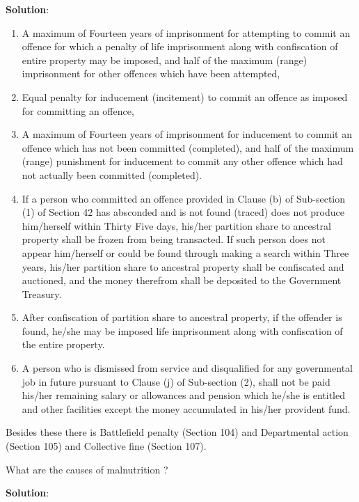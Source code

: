 \documentclass[
]{book}
\newcommand{\question}{\item}
\newenvironment{solution}{ {\bfseries Solution}:}{}
\begin{document}
\begin{questions}
\begin{solution}
\begin{enumerate}
  \begin{enumerate}
    \item A maximum of Fourteen years of imprisonment for attempting to commit an offence for which a penalty of life imprisonment along with confiscation of entire property may be imposed, and half of the maximum (range) imprisonment for other offences which have been attempted,
    \item Equal penalty for inducement (incitement) to commit an offence as imposed for committing an offence,
    \item A maximum of Fourteen years of imprisonment for inducement to commit an offence which has not been committed (completed), and half of the maximum (range) punishment for inducement to commit any other offence which had not actually been committed (completed).
    \item If a person who committed an offence provided in Clause (b) of Sub-section (1) of Section 42 has absconded and is not found (traced) does not produce him/herself within Thirty Five days, his/her partition share to ancestral property shall be frozen from being transacted. If such person does not appear him/herself or could be found through making a search within Three years, his/her partition share to ancestral property shall be confiscated and auctioned, and the money therefrom shall be deposited to the Government Treasury.
    \item After confiscation of partition share to ancestral property, if the  offender is found, he/she may be imposed life imprisonment along with confiscation of the entire property.
    \item A person who is dismissed from service and disqualified for any governmental job in future pursuant to Clause (j) of Sub-section (2), shall not be paid his/her remaining salary or allowances and pension which he/she is entitled and other facilities except the money accumulated in his/her provident fund.
  \end{enumerate}
\end{enumerate}

Besides these there is Battlefield penalty (Section 104) and Departmental action (Section 105) and Collective fine (Section 107).

\end{solution}

\question What are the causes of malnutrition ?

\begin{solution}


\end{solution}
\end{questions}
\end{document}
